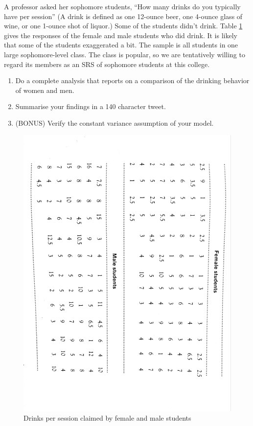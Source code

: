 \documentclass[letterpaper,9pt,twoside,printwatermark=false]{pinp}
\providecommand{\tightlist}{%
  \setlength{\itemsep}{0pt}\setlength{\parskip}{0pt}}
\begin{document}
A professor asked her sophomore students, ``How many drinks do you
typically have per session'' (A drink is defined as one 12-ounce beer,
one 4-ounce glass of wine, or one 1-ounce shot of liquor.) Some of the
students didn't drink. Table \ref{fig:tab2} gives the responses of the
female and male students who did drink. It is likely that some of the
students exaggerated a bit. The sample is all students in one large
sophomore-level class. The class is popular, so we are tentatively
willing to regard its members as an SRS of sophomore students at this
college.

\begin{enumerate}
\def\labelenumi{\alph{enumi}.}
\tightlist
\item
  Do a complete analysis that reports on a comparison of the drinking
  behavior of women and men.
\item
  Summarise your findings in a 140 character tweet.
\item
  (BONUS) Verify the constant variance assumption of your model.
\end{enumerate}

\begin{figure}[h]
  \begin{center}
    \includegraphics[scale=0.55, angle=90]{a81-crop.pdf} 
  \end{center}
  \caption{Drinks per session claimed by female and male students}\label{fig:tab2}
\end{figure}
\end{document}
